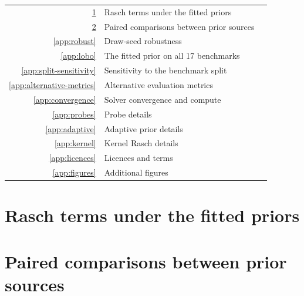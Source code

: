 \documentclass{article}
\begin{document}
\noindent\small\begin{tabular}{@{}rlr@{}}
\ref{app:ladder} & Rasch terms under the fitted priors & \pageref{app:ladder}\\
\ref{app:paired} & Paired comparisons between prior sources & \pageref{app:paired}\\
\ref{app:robust} & Draw-seed robustness & \pageref{app:robust}\\
\ref{app:lobo} & The fitted prior on all 17 benchmarks & \pageref{app:lobo}\\
\ref{app:split-sensitivity} & Sensitivity to the benchmark split & \pageref{app:split-sensitivity}\\
\ref{app:alternative-metrics} & Alternative evaluation metrics & \pageref{app:alternative-metrics}\\
\ref{app:convergence} & Solver convergence and compute & \pageref{app:convergence}\\
\ref{app:probes} & Probe details & \pageref{app:probes}\\
\ref{app:adaptive} & Adaptive prior details & \pageref{app:adaptive}\\
\ref{app:kernel} & Kernel Rasch details & \pageref{app:kernel}\\
\ref{app:licences} & Licences and terms & \pageref{app:licences}\\
\ref{app:figures} & Additional figures & \pageref{app:figures}\\
\end{tabular}
\normalsize\vspace{6pt}


\section{Rasch terms under the fitted priors}\label{app:ladder}
\vspace{-10pt}
\begin{table}[H]
  \caption{$\Delta_{m-\mathrm{J}}$ for Rasch with terms switched off (prior width $\sigma$ set near zero), under the training-fitted priors. Competition-shaped draws on OOD validation and OOD test. Bold: lowest in each column.}
  \centering\small
  
\end{table}

\section{Paired comparisons between prior sources}\label{app:paired}
\vspace{-10pt}
\begin{table}[H]
  \caption{Paired $\Delta_{a-b}$ between prior sources, with 95\% intervals over tasks. Each comparison changes sign between OOD test and OOD validation. A dash: not run on ID.}
  \centering\small\setlength{\tabcolsep}{4.5pt}
  
\end{table}
\end{document}
